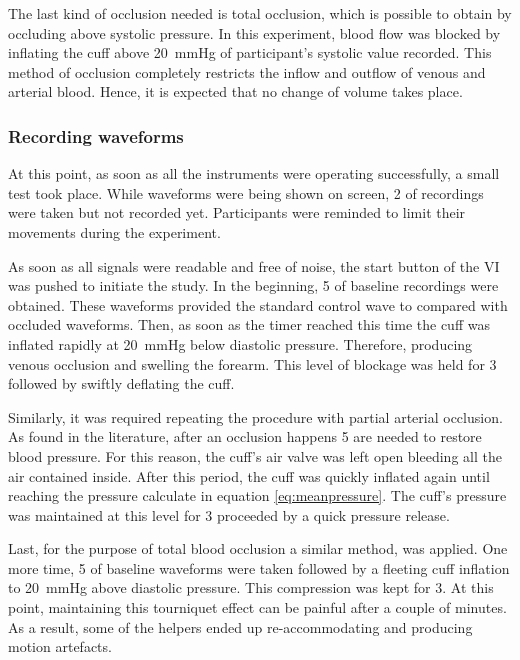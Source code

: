 The last kind of occlusion needed is total occlusion, which is possible to obtain by occluding above systolic pressure. In this experiment, blood flow was blocked by inflating the cuff above \SI{20}{\mmHg} of participant's systolic value recorded. This method of occlusion completely restricts the inflow and outflow of venous and arterial blood. Hence, it is expected that no change of volume takes place.

\subsubsection{Recording waveforms}

At this point, as soon as all the instruments were operating successfully, a small test took place. While waveforms were being shown on screen, \SI{2}{\min} of recordings were taken but not recorded yet. Participants were reminded to limit their movements during the experiment. 

As soon as all signals were readable and free of noise, the start button of the VI was pushed to initiate the study. In the beginning, \SI{5}{\min} of baseline recordings were obtained. These waveforms provided the standard control wave to compared with occluded waveforms. Then, as soon as the timer reached this time the cuff was inflated rapidly at \SI{20}{\mmHg} below diastolic pressure. Therefore, producing venous occlusion and swelling the forearm. This level of blockage was held for \SI{3}{\min} followed by swiftly deflating the cuff. 

Similarly, it was required repeating the procedure with partial arterial occlusion. As found in the literature, after an occlusion happens \SI{5}{\min} are needed to restore blood pressure. For this reason, the cuff's air valve was left open bleeding all the air contained inside. After this period, the cuff was quickly inflated again until reaching the pressure calculate in equation \ref{eq:meanpressure}. The cuff's pressure was maintained at this level for \SI{3}{\min} proceeded by a quick pressure release. 

Last, for the purpose of total blood occlusion a similar method, was applied. One more time, \SI{5}{\min} of baseline waveforms were taken followed by a fleeting cuff inflation to \SI{20}{\mmHg} above diastolic pressure. This compression was kept for \SI{3}{\min}. At this point, maintaining this tourniquet effect can be painful after a couple of minutes. As a result, some of the helpers ended up re-accommodating and producing motion artefacts. 

